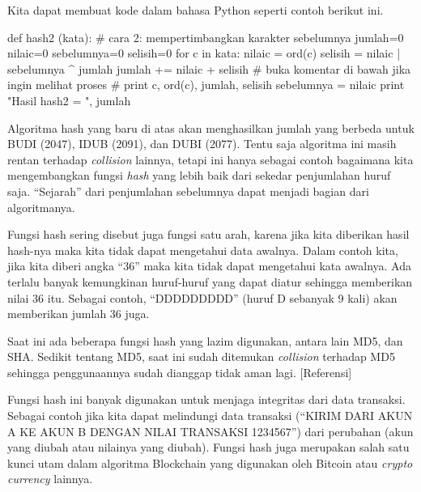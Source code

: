 Kita dapat membuat kode dalam bahasa Python seperti contoh berikut ini. 

\begin{python}
def hash2 (kata):
	# cara 2: mempertimbangkan karakter sebelumnya
	jumlah=0
	nilaic=0
	sebelumnya=0
	selisih=0
	for c in kata:
		nilaic = ord(c)
		selisih = nilaic | sebelumnya ^ jumlah
		jumlah += nilaic + selisih
		# buka komentar di bawah jika ingin melihat proses
		# print c, ord(c), jumlah, selisih
		sebelumnya = nilaic
	print "Hasil hash2 = ", jumlah
\end{python}

Algoritma hash yang baru di atas akan menghasilkan jumlah yang berbeda untuk BUDI (2047), IDUB (2091), dan DUBI (2077). Tentu saja algoritma ini masih rentan terhadap {\em collision} lainnya, tetapi ini hanya sebagai contoh bagaimana kita mengembangkan fungsi {\em hash} yang lebih baik dari sekedar penjumlahan huruf saja. ``Sejarah'' dari penjumlahan sebelumnya dapat menjadi bagian dari algoritmanya.

Fungsi hash sering disebut juga fungsi satu arah, karena jika kita diberikan hasil hash-nya maka kita tidak dapat mengetahui data awalnya. Dalam contoh kita, jika kita diberi angka ``36'' maka kita tidak dapat mengetahui kata awalnya. Ada terlalu banyak kemungkinan huruf-huruf yang dapat diatur sehingga memberikan nilai 36 itu. Sebagai contoh, ``DDDDDDDDD'' (huruf D sebanyak 9 kali) akan memberikan jumlah 36 juga.

Saat ini ada beberapa fungsi hash yang lazim digunakan, antara lain MD5, dan SHA. Sedikit tentang MD5, saat ini sudah ditemukan {\em collision} terhadap MD5 sehingga penggunaannya sudah dianggap tidak aman lagi. [Referensi]

Fungsi hash ini banyak digunakan untuk menjaga integritas dari data transaksi. Sebagai contoh jika kita dapat melindungi data transaksi (``KIRIM DARI AKUN A KE AKUN B DENGAN NILAI TRANSAKSI 1234567'') dari perubahan (akun yang diubah atau nilainya yang diubah). Fungsi hash juga merupakan salah satu kunci utam dalam algoritma Blockchain yang digunakan oleh Bitcoin atau {\em crypto currency} lainnya.
